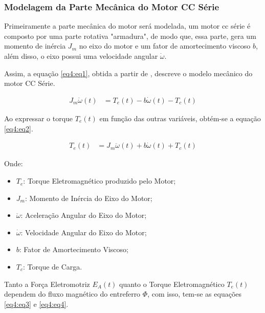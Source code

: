 
\subsubsection{Modelagem da Parte Mecânica do Motor CC Série}

Primeiramente a parte mecânica do motor será modelada, um motor cc série é composto por uma parte rotativa "armadura", de modo que, essa parte, gera um momento de inércia $J_m$ no eixo do motor e um fator de amortecimento viscoso $b$, além disso, o eixo possui uma velocidade angular $\dot{\omega}$.

Assim, a equação \ref{eq4:eq1}, obtida a partir de \cite{jesus}, descreve o modelo mecânico do motor CC Série.

\begin{align}
	J_m\ddot{\omega}(t) &= T_e(t) - b\dot{\omega}(t) - T_c(t) \label{eq4:eq1}
\end{align}


Ao expressar o torque $T_e(t)$ em função das outras variáveis, obtém-se a equação \ref{eq4:eq2}.

\begin{align}
	T_e(t) &= J_m\ddot{\omega}(t) + b\dot{\omega}(t) + T_c(t) \label{eq4:eq2}
\end{align}


Onde:
\begin{itemize}
        \setlength{\itemsep}{-2pt}
	\item $T_e$: Torque Eletromagnético produzido pelo Motor;
	\item $J_m$: Momento de Inércia do Eixo do Motor;
	\item $\ddot{\omega}$: Aceleração Angular do Eixo do Motor;
	\item $\dot{\omega}$: Velocidade Angular do Eixo do Motor;
	\item $b$: Fator de Amortecimento Viscoso;
	\item $T_c$: Torque de Carga.
\end{itemize}

Tanto a Força Eletromotriz $E_A(t)$ quanto o Torque Eletromagnético $T_e(t)$ dependem do fluxo magnético do entreferro $\Phi$, com isso, tem-se as equações \ref{eq4:eq3} e \ref{eq4:eq4}.

